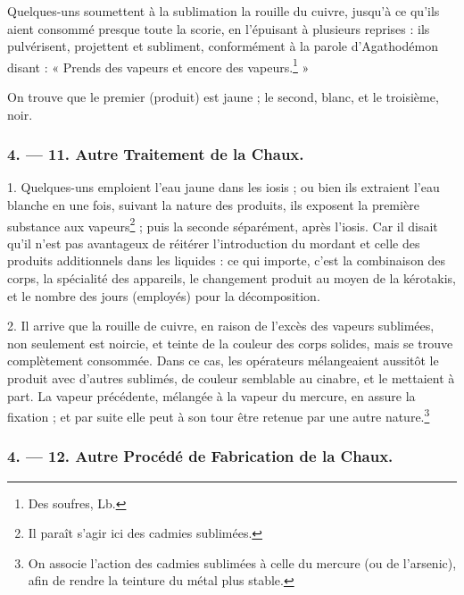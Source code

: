 \documentclass[a4paper, 11pt, oneside, polutonikogreek, french]{article}
\begin{document}
Quelques-uns soumettent à la sublimation la rouille du cuivre, jusqu'à ce qu'ils aient consommé presque toute la scorie, en l'épuisant à plusieurs reprises : ils pulvérisent, projettent et subliment, conformément à la parole d'Agathodémon disant : « Prends des vapeurs et encore des vapeurs.\footnote{Des soufres, Lb.} »

On trouve que le premier (produit) est jaune ; le second, blanc, et le troisième, noir.

\bigskip
\centerline{\EightStarTaper}
\centerline{\EightStarTaper\EightStarTaper}
\bigskip

\subsubsection{4. --- 11. Autre Traitement de la Chaux.}

1. Quelques-uns emploient l'eau jaune dans les iosis ; ou bien ils extraient l'eau blanche en une fois, suivant la nature des produits, ils exposent la première substance aux vapeurs\footnote{Il paraît s'agir ici des cadmies sublimées.} ; puis la seconde séparément, après l'iosis. Car il disait qu'il n'est pas avantageux de réitérer l'introduction du mordant et celle des produits additionnels dans les liquides : ce qui importe, c'est la combinaison des corps, la spécialité des appareils, le changement produit au moyen de la kérotakis, et le nombre des jours (employés) pour la décomposition.

2. Il arrive que la rouille de cuivre, en raison de l'excès des vapeurs sublimées, non seulement est noircie, et teinte de la couleur des corps solides, mais se trouve complètement consommée. Dans ce cas, les opérateurs mélangeaient aussitôt le produit avec d'autres sublimés, de couleur semblable au cinabre, et le mettaient à part. La vapeur précédente, mélangée à la vapeur du mercure, en assure la fixation ; et par suite elle peut à son tour être retenue par une autre nature.\footnote{On associe l'action des cadmies sublimées à celle du mercure (ou de l'arsenic), afin de rendre la teinture du métal plus stable.}

\bigskip
\centerline{\EightStarTaper}
\centerline{\EightStarTaper\EightStarTaper}
\bigskip

\subsubsection{4. --- 12. Autre Procédé de Fabrication de la Chaux.}
\end{document}
